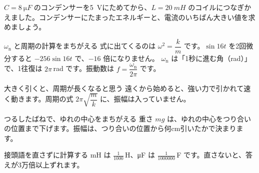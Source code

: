 \begin{jibun}
$C=\qty{8}{\micro F}$ のコンデンサーを\qty{5}{V}にためてから、$L=\qty{20}{mH}$ のコイルにつなぎかえました。コンデンサーにたまったエネルギーと、電流のいちばん大きい値を求めましょう。
\end{jibun}


\begin{tsumazuki}{$\omega_{\mathrm n}$ と周期の計算をまちがえる}
式に出てくるのは $\omega^2=\dfrac{k}{m}$ です。$\sin16t$ を2回微分すると $-256\sin16t$ で、$-16$ 倍になりません。
$\omega_{\mathrm n}$ は「1秒に進む角（rad）」で、1往復は $2\pi$\,rad です。振動数は $f=\dfrac{\omega_{\mathrm n}}{2\pi}$ です。
\end{tsumazuki}

\begin{tsumazuki}{大きく引くと、周期が長くなると思う}
遠くから始めると、強い力で引かれて速く動きます。周期の式 $2\pi\sqrt{\dfrac{m}{k}}$ に、振幅は入っていません。
\end{tsumazuki}

\begin{tsumazuki}{つるしたばねで、ゆれの中心をまちがえる}
重さ $mg$ は、ゆれの中心をつり合いの位置まで下げます。振幅は、つり合いの位置から何cm引いたかで決まります。
\end{tsumazuki}

\begin{tsumazuki}{接頭語を直さずに計算する}
mH は $\frac{1}{1000}$\,H、μF は $\frac{1}{1000000}$\,F です。直さないと、答えが3万倍以上ずれます。
\end{tsumazuki}


